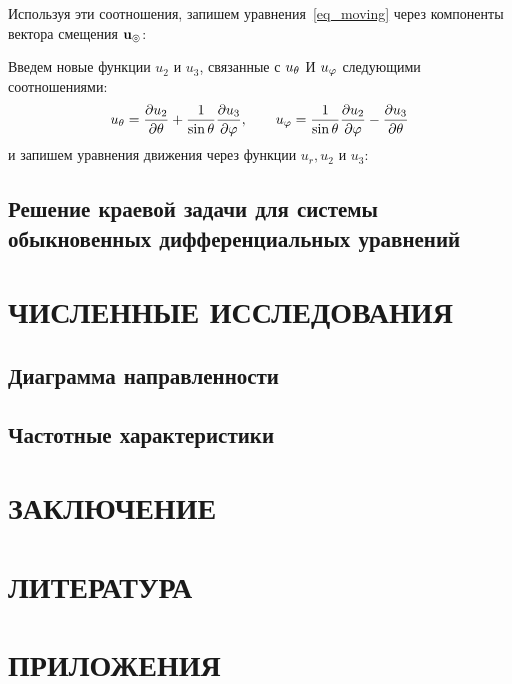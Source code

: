 Используя эти соотношения, запишем уравнения~\eqref{eq_moving} через компоненты вектора смещения $\mathbf{u_\circledcirc}$:

Введем новые функции $u_2$ и $u_3$, связанные с $u_\theta$ И $u_\varphi$ следующими соотношениями:
$$
u_\theta = \dfrac{\partial u_2}{\partial\theta} + \frac1{\sin\theta}\frac{\partial u_3}{\partial\varphi}, \qquad u_\varphi = \dfrac1{\sin\theta}\dfrac{\partial u_2}{\partial\varphi} - \dfrac{\partial u_3}{\partial\theta}
$$
и запишем уравнения движения через функции $u_r, u_2$ и $u_3:$

\newpage
\subsection{Решение краевой задачи для системы обыкновенных дифференциальных уравнений}

\newpage
\section{ЧИСЛЕННЫЕ ИССЛЕДОВАНИЯ}

\newpage
\subsection{Диаграмма направленности}

\newpage
\subsection{Частотные характеристики}

\newpage
\section*{ЗАКЛЮЧЕНИЕ}


\newpage
\section*{ЛИТЕРАТУРА}


\newpage
\section*{ПРИЛОЖЕНИЯ}



\grid
\grid
